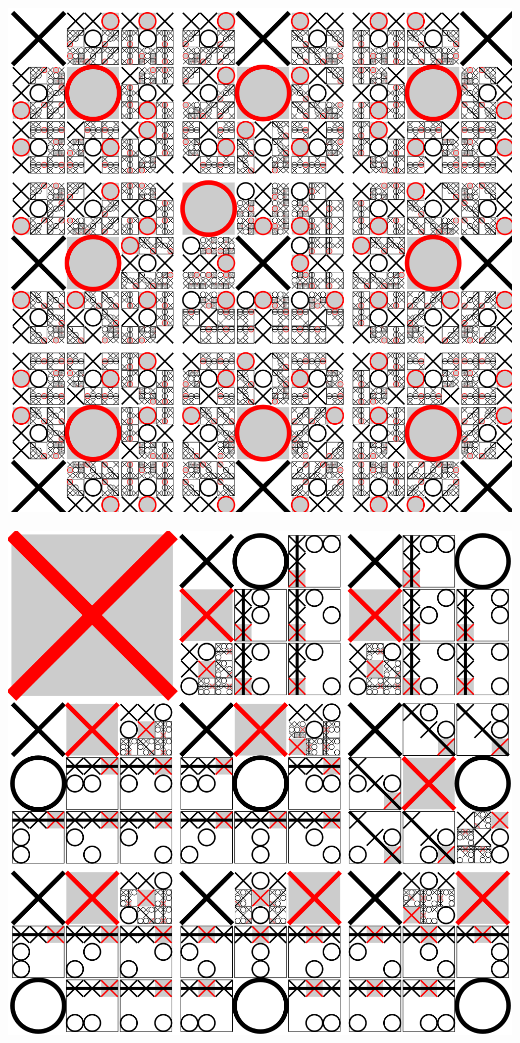 \documentclass[a4paper,ngerman,landscape,12pt]{scrartcl}
\begin{document}
\vfill
\begin{center}
\includegraphics[scale=0.55]{Tictactoe-O}
\end{center}
\vfill

\vfill
\begin{center}
\includegraphics[scale=0.55]{Tictactoe-X}
\end{center}
\vfill
\end{document}
